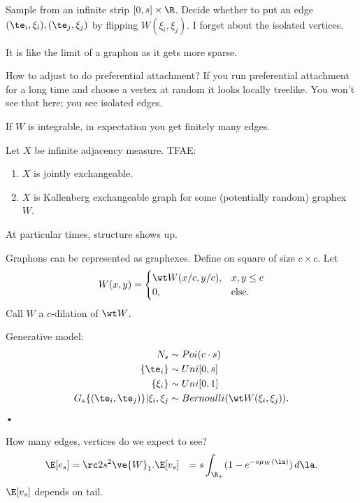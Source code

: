 Sample from an infinite strip $[0,s]\times \R$. Decide whether to put an edge $(\te_i,\xi_i), (\te_j,\xi_j)$ by flipping $W(\xi_i,\xi_j)$. I forget about the isolated vertices.

It is like the limit of a graphon as it gets more sparse.

How to adjust to do preferential attachment? If you run preferential attachment for a long time and choose a vertex at random it looks locally treelike. You won't see that here; you see isolated edges.


If $W$ is integrable, in expectation you get finitely many edges. 


Let $X$ be infinite adjacency measure. TFAE:
\begin{enumerate}
\item
$X$ is jointly exchangeable.
\item
$X$ is Kallenberg exchangeable graph for some (potentially random) graphex $W$. 
\end{enumerate}

At particular times, structure shows up.

Graphons can be represented as graphexes. Define on square of size $c\times c$. 
Let
$$
W(x,y) = \begin{cases}
\wt W(x/c,y/c),&x,y\le c\\
0,&\text{else}.
\end{cases}
$$
Call $W$ a $c$-dilation of $\wt W$. 

Generative model:
\begin{align}
N_s &\sim Poi(c\cdot s)\\
\{\te_i\}&\sim Uni[0,s]\\
\{\xi_i\}&\sim Uni[0,1]\\
G_s\{(\te_i,\te_j)\}|\xi_i,\xi_j &\sim Bernoulli (\wt W(\xi_i,\xi_j)).
\end{align}•

How many edges, vertices do we expect to see?
\begin{align}
\E[e_s] &= \rc 2 s^2 \ve{W}_1.
\E[v_s]& = s\int_{\R_+} (1-e^{-s\mu_W(\la)})\,d\la.
\end{align}
$\E [v_s]$ depends on tail.

